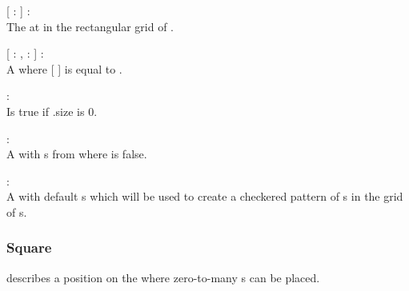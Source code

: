 \begin{dlist}
  \item {}[  :  ] : \\
  The  at  in the rectangular grid of .
  
  \item {}[  : ,  :  ] : \\
  A  where [  ] is equal to .
  
  \item {} : \\
  Is true if .size is 0.
  
  \item {} : \\
  A  with s from  where  is false.
  
  \item {} : \\
  A  with default s which will be used to create a checkered pattern of s in the grid of s.
\end{dlist}

\subsubsection{Square}
 describes a position on the  where zero-to-many s can be placed.

